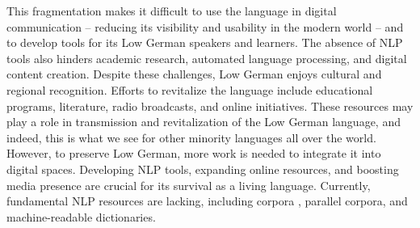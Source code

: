 
This fragmentation makes it difficult to use the language in digital communication -- reducing its visibility and usability in the modern world -- and to develop tools for its Low German speakers and learners. The absence of NLP tools also hinders academic research, automated language processing, and digital content creation. Despite these challenges, Low German enjoys cultural and regional recognition. Efforts to revitalize the language include educational programs, literature, radio broadcasts, and online initiatives. These resources may play a role in transmission and revitalization of the Low German language, and indeed, this is what we see for other minority languages all over the world. However, to preserve Low German, more work is needed to integrate it into digital spaces. Developing NLP tools, expanding online resources, and boosting media presence are crucial for its survival as a living language. Currently, fundamental NLP resources are lacking, including corpora \cite{siewert2021towards}, parallel corpora, and machine-readable dictionaries. 

